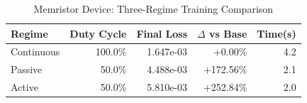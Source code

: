 \begin{table}[htbp]
\centering
\caption{Memristor Device: Three-Regime Training Comparison}
\label{tab:memristor_regimes}
\begin{tabular}{lrrrr}
\hline
Regime & Duty Cycle & Final Loss & $\Delta$ vs Base & Time(s) \\
\hline
Continuous & 100.0\% & 1.647e-03 & +0.00\% & 4.2 \\
Passive & 50.0\% & 4.488e-03 & +172.56\% & 2.1 \\
Active & 50.0\% & 5.810e-03 & +252.84\% & 2.0 \\
\hline
\end{tabular}
\end{table}
